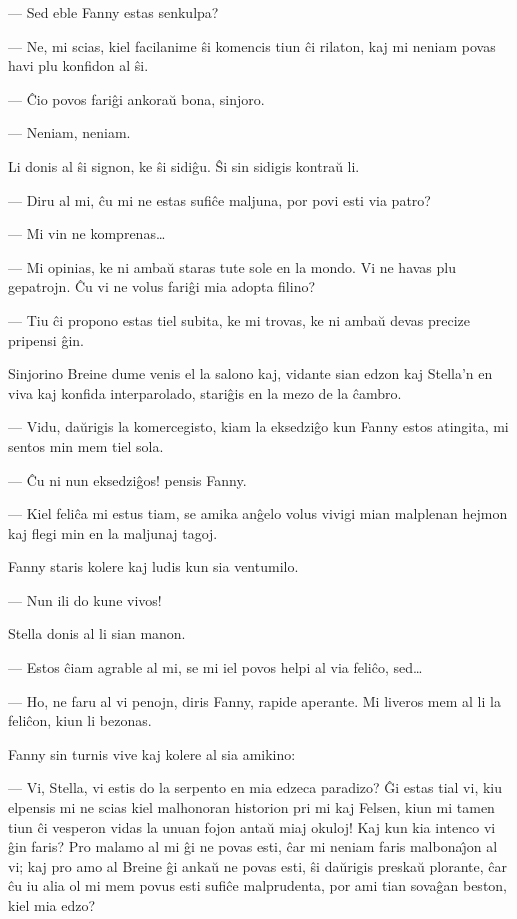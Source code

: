 --- Sed eble Fanny estas senkulpa?

 --- Ne, mi scias, kiel facilanime \^si komencis tiun \^ci rilaton, kaj
mi neniam povas havi plu konfidon al \^si.

 --- \^Cio povos fari\^gi ankora\u u bona, sinjoro.

 --- Neniam, neniam.

   Li donis al \^si signon, ke \^si sidi\^gu. \^Si sin sidigis kontra\u u li.

 --- Diru al mi, \^cu mi ne estas sufi\^ce maljuna, por povi esti via
patro?

 --- Mi vin ne komprenas\dots

 --- Mi opinias, ke ni amba\u u staras tute sole en la mondo. Vi ne havas
plu gepatrojn. \^Cu vi ne volus fari\^gi mia adopta filino?

 --- Tiu \^ci propono estas tiel subita, ke mi trovas, ke ni amba\u u
devas precize pripensi \^gin.

   Sinjorino Breine dume venis el la salono kaj, vidante sian edzon kaj
Stella'n en viva kaj konfida interparolado, stari\^gis en la mezo de
la \^cambro.

 --- Vidu, da\u urigis la komercegisto, kiam la eksedzi\^go kun Fanny
estos atingita, mi sentos min mem tiel sola.

 --- \^Cu ni nun eksedzi\^gos! pensis Fanny.

 --- Kiel feli\^ca mi estus tiam, se amika an\^gelo volus vivigi mian
malplenan hejmon kaj flegi min en la maljunaj tagoj.

   Fanny staris kolere kaj ludis kun sia ventumilo.

 --- Nun ili do kune vivos!

   Stella donis al li sian manon.

 --- Estos \^ciam agrable al mi, se mi iel povos helpi al via feli\^co,
sed\dots

 --- Ho, ne faru al vi penojn, diris Fanny, rapide aperante. Mi liveros
mem al li la feli\^con, kiun li bezonas.

   Fanny sin turnis vive kaj kolere al sia amikino:

 --- Vi, Stella, vi estis do la serpento en mia edzeca paradizo? \^Gi
estas tial vi, kiu elpensis mi ne scias kiel malhonoran historion
pri mi kaj Felsen, kiun mi tamen tiun \^ci vesperon vidas la unuan
fojon anta\u u miaj okuloj! Kaj kun kia intenco vi \^gin faris? Pro
malamo al mi \^gi ne povas esti, \^car mi neniam faris
malbona\^{\j}on al vi; kaj pro amo al Breine \^gi anka\u u ne povas
esti, \^si da\u urigis preska\u u plorante, \^car \^cu iu alia ol mi
mem povus esti sufi\^ce malprudenta, por ami tian sova\^gan beston,
kiel mia edzo?

